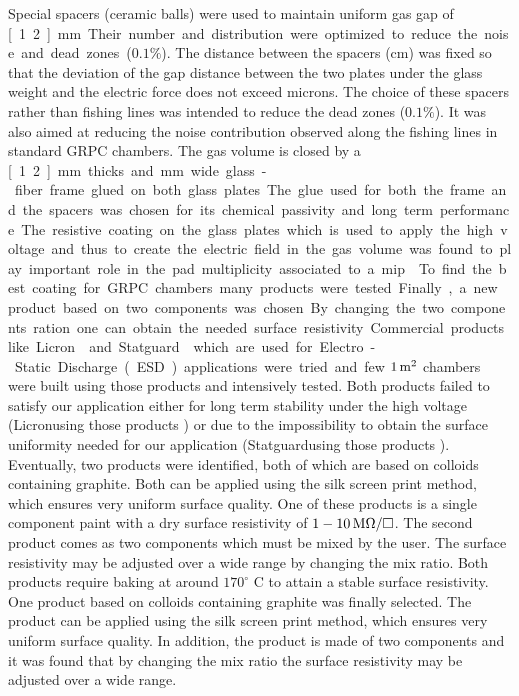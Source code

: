 Special spacers (ceramic balls) were used to maintain uniform gas gap of \unit[1.2]{mm}.
Their number and distribution were optimized to reduce the noise and dead
zones ($0.1 \%$). The distance between the spacers (\unit[10]{cm}) was fixed so that
the deviation of the gap distance between the two plates under the glass weight
and the electric force does not exceed \unit[45]{microns}. The choice of these spacers
rather than fishing lines was intended to reduce the dead zones ($0.1 \%$). It
was also aimed at reducing the noise contribution observed along the fishing
lines in standard GRPC chambers. The gas volume is closed by a \unit[1.2]{mm} thicks
and \unit[3]{mm} wide glass-fiber frame glued on both glass plates. The glue used for
both the frame and the spacers was chosen for its chemical passivity and long
term performance.

The resistive coating on the glass plates which is used to apply the high
voltage and thus to create the electric field in the gas volume was found to
play important role in the pad multiplicity associated to a mip \cite{1748-0221-6-02-P02001}.
To find the best coating for GRPC chambers many products were tested. Finally, a
new product based on two components was chosen. By changing the two components
ration one can obtain the needed surface resistivity. Commercial products like
Licron\texttrademark and Statguard\texttrademark which are used for Electro-Static
Discharge (ESD) applications were tried and few $\unit[1]{m^2}$ chambers were built
using those products and intensively tested. Both products failed to satisfy our
application either for long term stability under the high voltage (Licronusing
those products ) or due to the impossibility to obtain the surface uniformity
needed for our application (Statguardusing those products ). Eventually, two
products were identified, both of which are based on colloids containing
graphite. Both can be applied using the silk screen print method, which ensures
very uniform surface quality. One of these products is a single component paint
with a dry surface resistivity of $\unit[1-10] M\Omega/\square$. The second product
comes as two components which must be mixed by the user. The surface resistivity
may be adjusted over a wide range by changing the mix ratio. Both products
require baking at around $170^\circ$ C to attain a stable surface resistivity.
One product based on colloids containing graphite was finally selected. The
product can be applied using the silk screen print method, which ensures very
uniform surface quality. In addition, the product is made of two components and
it was found that by changing the mix ratio the surface resistivity may be
adjusted over a wide range.

